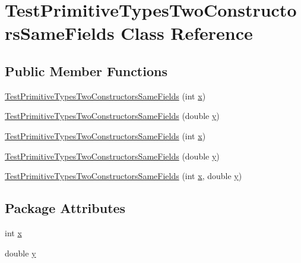 \hypertarget{classTestPrimitiveTypesTwoConstructorsSameFields}{
\section{TestPrimitiveTypesTwoConstructorsSameFields Class Reference}
\label{classTestPrimitiveTypesTwoConstructorsSameFields}
}
\subsection*{Public Member Functions}
\begin{DoxyCompactItemize}
\item 
\hyperlink{classTestPrimitiveTypesTwoConstructorsSameFields_acb91ae24e8c038943301711b431c0ece}{TestPrimitiveTypesTwoConstructorsSameFields} (int \hyperlink{classTestPrimitiveTypesTwoConstructorsSameFields_adc55009e1fea5c8c5aa7c686232cfc1b}{x})
\item 
\hyperlink{classTestPrimitiveTypesTwoConstructorsSameFields_a41236262af2f8693aa80296baed4fcbb}{TestPrimitiveTypesTwoConstructorsSameFields} (double \hyperlink{classTestPrimitiveTypesTwoConstructorsSameFields_a90973e1e1c42a798e0e228fa78c29a22}{y})
\item 
\hyperlink{classTestPrimitiveTypesTwoConstructorsSameFields_acb91ae24e8c038943301711b431c0ece}{TestPrimitiveTypesTwoConstructorsSameFields} (int \hyperlink{classTestPrimitiveTypesTwoConstructorsSameFields_adc55009e1fea5c8c5aa7c686232cfc1b}{x})
\item 
\hyperlink{classTestPrimitiveTypesTwoConstructorsSameFields_a41236262af2f8693aa80296baed4fcbb}{TestPrimitiveTypesTwoConstructorsSameFields} (double \hyperlink{classTestPrimitiveTypesTwoConstructorsSameFields_a90973e1e1c42a798e0e228fa78c29a22}{y})
\item 
\hyperlink{classTestPrimitiveTypesTwoConstructorsSameFields_ae1901291bf763a78cd5d8b4d8f05c43e}{TestPrimitiveTypesTwoConstructorsSameFields} (int \hyperlink{classTestPrimitiveTypesTwoConstructorsSameFields_adc55009e1fea5c8c5aa7c686232cfc1b}{x}, double \hyperlink{classTestPrimitiveTypesTwoConstructorsSameFields_a90973e1e1c42a798e0e228fa78c29a22}{y})
\end{DoxyCompactItemize}
\subsection*{Package Attributes}
\begin{DoxyCompactItemize}
\item 
int \hyperlink{classTestPrimitiveTypesTwoConstructorsSameFields_adc55009e1fea5c8c5aa7c686232cfc1b}{x}
\item 
double \hyperlink{classTestPrimitiveTypesTwoConstructorsSameFields_a90973e1e1c42a798e0e228fa78c29a22}{y}
\end{DoxyCompactItemize}


